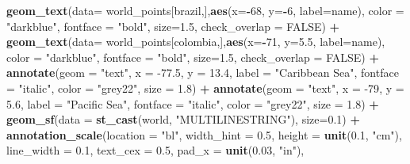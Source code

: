 \documentclass[12pt,oneside]{reedthesis}
\newenvironment{Shaded}{\begin{snugshade}}{\end{snugshade}}
\newcommand{\DataTypeTok}[1]{\textcolor[rgb]{0.13,0.29,0.53}{#1}}
\newcommand{\DecValTok}[1]{\textcolor[rgb]{0.00,0.00,0.81}{#1}}
\newcommand{\FloatTok}[1]{\textcolor[rgb]{0.00,0.00,0.81}{#1}}
\newcommand{\KeywordTok}[1]{\textcolor[rgb]{0.13,0.29,0.53}{\textbf{#1}}}
\newcommand{\NormalTok}[1]{#1}
\newcommand{\OperatorTok}[1]{\textcolor[rgb]{0.81,0.36,0.00}{\textbf{#1}}}
\newcommand{\OtherTok}[1]{\textcolor[rgb]{0.56,0.35,0.01}{#1}}
\newcommand{\StringTok}[1]{\textcolor[rgb]{0.31,0.60,0.02}{#1}}
\begin{document}
\begin{Shaded}
\begin{Highlighting}[]
\StringTok{  }\KeywordTok{geom_text}\NormalTok{(}\DataTypeTok{data=}\NormalTok{ world_points[brazil,],}\KeywordTok{aes}\NormalTok{(}\DataTypeTok{x=}\OperatorTok{-}\DecValTok{68}\NormalTok{, }\DataTypeTok{y=}\OperatorTok{-}\DecValTok{6}\NormalTok{, }\DataTypeTok{label=}\NormalTok{name), }\DataTypeTok{color =} \StringTok{"darkblue"}\NormalTok{, }\DataTypeTok{fontface =} \StringTok{"bold"}\NormalTok{, }\DataTypeTok{size=}\FloatTok{1.5}\NormalTok{, }\DataTypeTok{check_overlap =} \OtherTok{FALSE}\NormalTok{) }\OperatorTok{+}
\StringTok{  }\KeywordTok{geom_text}\NormalTok{(}\DataTypeTok{data=}\NormalTok{ world_points[colombia,],}\KeywordTok{aes}\NormalTok{(}\DataTypeTok{x=}\OperatorTok{-}\DecValTok{71}\NormalTok{, }\DataTypeTok{y=}\FloatTok{5.5}\NormalTok{, }\DataTypeTok{label=}\NormalTok{name), }\DataTypeTok{color =} \StringTok{"darkblue"}\NormalTok{, }\DataTypeTok{fontface =} \StringTok{"bold"}\NormalTok{, }\DataTypeTok{size=}\FloatTok{1.5}\NormalTok{, }\DataTypeTok{check_overlap =} \OtherTok{FALSE}\NormalTok{) }\OperatorTok{+}
\StringTok{  }\KeywordTok{annotate}\NormalTok{(}\DataTypeTok{geom =} \StringTok{"text"}\NormalTok{, }\DataTypeTok{x =} \FloatTok{-77.5}\NormalTok{, }\DataTypeTok{y =} \FloatTok{13.4}\NormalTok{, }\DataTypeTok{label =} \StringTok{"Caribbean Sea"}\NormalTok{, }\DataTypeTok{fontface =} \StringTok{"italic"}\NormalTok{, }\DataTypeTok{color =} \StringTok{"grey22"}\NormalTok{, }\DataTypeTok{size =} \FloatTok{1.8}\NormalTok{) }\OperatorTok{+}\StringTok{ }
\StringTok{  }\KeywordTok{annotate}\NormalTok{(}\DataTypeTok{geom =} \StringTok{"text"}\NormalTok{, }\DataTypeTok{x =} \DecValTok{-79}\NormalTok{, }\DataTypeTok{y =} \FloatTok{5.6}\NormalTok{, }\DataTypeTok{label =} \StringTok{"Pacific Sea"}\NormalTok{, }\DataTypeTok{fontface =} \StringTok{"italic"}\NormalTok{, }\DataTypeTok{color =} \StringTok{"grey22"}\NormalTok{, }\DataTypeTok{size =} \FloatTok{1.8}\NormalTok{) }\OperatorTok{+}
\StringTok{  }\KeywordTok{geom_sf}\NormalTok{(}\DataTypeTok{data =} \KeywordTok{st_cast}\NormalTok{(world, }\StringTok{"MULTILINESTRING"}\NormalTok{), }\DataTypeTok{size=}\FloatTok{0.1}\NormalTok{) }\OperatorTok{+}
\StringTok{  }\KeywordTok{annotation_scale}\NormalTok{(}\DataTypeTok{location =} \StringTok{"bl"}\NormalTok{, }\DataTypeTok{width_hint =} \FloatTok{0.5}\NormalTok{, }\DataTypeTok{height =} \KeywordTok{unit}\NormalTok{(}\FloatTok{0.1}\NormalTok{, }\StringTok{"cm"}\NormalTok{), }\DataTypeTok{line_width =} \FloatTok{0.1}\NormalTok{, }\DataTypeTok{text_cex =} \FloatTok{0.5}\NormalTok{, }\DataTypeTok{pad_x =} \KeywordTok{unit}\NormalTok{(}\FloatTok{0.03}\NormalTok{, }\StringTok{"in"}\NormalTok{), }

\end{Highlighting}
\end{Shaded}
\end{document}
